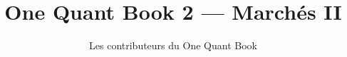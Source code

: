 \documentclass[11pt,a4paper,twoside,openany]{book}
\title{One Quant Book 2 --- Marchés II}
\author{Les contributeurs du One Quant Book}
\date{\bookdate}
\begin{document}
\frontmatter



\tableofcontents

\mainmatter


\appendix
\part{\omsolutionspart}


\backmatter
\printindex
\end{document}
